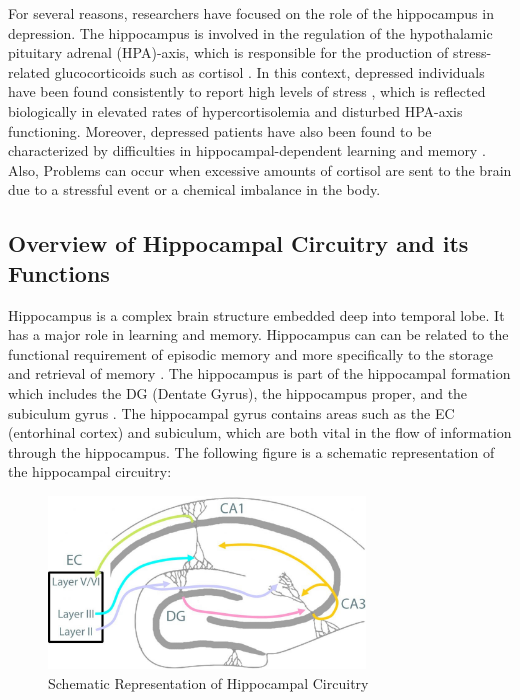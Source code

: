 ﻿\documentclass[12pt]{article}
\begin{document}
\enlargethispage{\baselineskip}
For several reasons, researchers have focused on the role of the
hippocampus in depression. The hippocampus is involved in the
regulation of the hypothalamic pituitary adrenal (HPA)-axis, which is
responsible for the production of stress-related glucocorticoids such
as cortisol \cite{cortisol}. In this context, depressed individuals
have been found consistently to report high levels of stress
\cite{stress}, which is reflected biologically in elevated rates of
hypercortisolemia and disturbed HPA-axis functioning. Moreover,
depressed patients have also been found to be characterized by
difficulties in hippocampal-dependent learning and memory
\cite{learning}. Also, Problems can occur when excessive amounts of
cortisol are sent to the brain due to a stressful event or a chemical
imbalance in the body.

\newpage
\subsection{Overview of Hippocampal Circuitry and its Functions}

Hippocampus is a complex brain structure embedded deep into temporal
lobe. It has a major role in learning and memory. Hippocampus can can
be related to the functional requirement of episodic memory and more
specifically to the storage and retrieval of memory
\cite{hippocampal}. The hippocampus is part of the hippocampal
formation which includes the DG (Dentate Gyrus), the hippocampus
proper, and the subiculum gyrus \cite{limbic}. The hippocampal gyrus
contains areas such as the EC (entorhinal cortex) and subiculum, which
are both vital in the flow of information through the hippocampus. The
following figure\cite{hippocampalcircuitry} is a schematic
representation of the hippocampal circuitry:

\begin{figure}[H]
  \centering
  \includegraphics[width=0.75\textwidth]{hippocampal-circuitry.jpg}
  \caption{Schematic Representation of Hippocampal Circuitry
  }
\end{figure}
\end{document}
